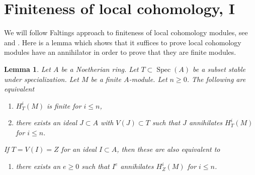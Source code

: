 \documentclass{stacks-project}
\newenvironment{reference}{\comment}{\endcomment}
\theoremstyle{plain}
\newtheorem{lemma}[subsection]{Lemma}
\theoremstyle{definition}
\theoremstyle{remark}
\numberwithin{equation}{subsection}
\def\Spec{\mathop{\mathrm{Spec}}}
\begin{document}
\section{Finiteness of local cohomology, I}
\label{section-finiteness}

\noindent
We will follow Faltings approach to finiteness of local cohomology
modules, see \cite{Faltings-annulators} and \cite{Faltings-finiteness}.
Here is a lemma which shows that it suffices to prove
local cohomology modules have an annihilator in order to prove that
they are finite modules.

\begin{lemma}
\label{lemma-check-finiteness-local-cohomology-by-annihilator}
\begin{reference}
\cite[Lemma 3]{Faltings-annulators}
\end{reference}
Let $A$ be a Noetherian ring. Let $T \subset \Spec(A)$ be a subset stable
under specialization. Let $M$ be a finite $A$-module. Let $n \geq 0$.
The following are equivalent
\begin{enumerate}
\item $H^i_T(M)$ is finite for $i \leq n$,
\item there exists an ideal $J \subset A$ with $V(J) \subset T$
such that $J$ annihilates $H^i_T(M)$ for $i \leq n$.
\end{enumerate}
If $T = V(I) = Z$ for an ideal $I \subset A$, then these are also
equivalent to
\begin{enumerate}
\item[(3)] there exists an $e \geq 0$ such that $I^e$ annihilates
$H^i_Z(M)$ for $i \leq n$.
\end{enumerate}
\end{lemma}
\end{document}
